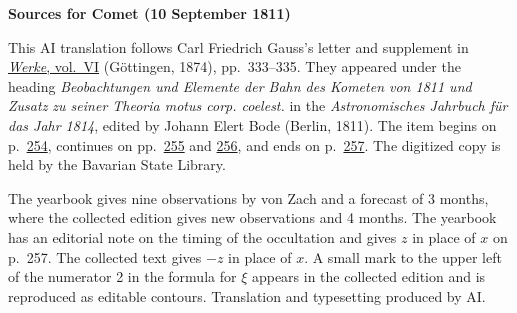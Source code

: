 \clearpage\thispagestyle{empty}
\begin{center}\textbf{Sources for Comet (10 September 1811)}\end{center}
\noindent This AI translation follows Carl Friedrich Gauss’s letter and supplement in \href{https://gdz.sub.uni-goettingen.de/id/PPN236007467}{\textit{Werke}, vol.~VI} (Göttingen, 1874), pp.~333--335. They appeared under the heading \textit{Beobachtungen und Elemente der Bahn des Kometen von 1811 und Zusatz zu seiner Theoria motus corp. coelest.} in the \textit{Astronomisches Jahrbuch für das Jahr 1814}, edited by Johann Elert Bode (Berlin, 1811). The item begins on p.~\href{https://api.digitale-sammlungen.de/iiif/image/v2/bsb10538343_00262/full/1600,/0/default.jpg}{254}, continues on pp.~\href{https://api.digitale-sammlungen.de/iiif/image/v2/bsb10538343_00263/full/1600,/0/default.jpg}{255} and \href{https://api.digitale-sammlungen.de/iiif/image/v2/bsb10538343_00264/full/1600,/0/default.jpg}{256}, and ends on p.~\href{https://api.digitale-sammlungen.de/iiif/image/v2/bsb10538343_00265/full/1600,/0/default.jpg}{257}. The digitized copy is held by the Bavarian State Library.
\par\smallskip\noindent The yearbook gives nine observations by von Zach and a forecast of 3 months, where the collected edition gives new observations and 4 months. The yearbook has an editorial note on the timing of the occultation and gives $z$ in place of $x$ on p.~257. The collected text gives $-z$ in place of $x$. A small mark to the upper left of the numerator 2 in the formula for $\xi$ appears in the collected edition and is reproduced as editable contours. Translation and typesetting produced by AI.
\clearpage
